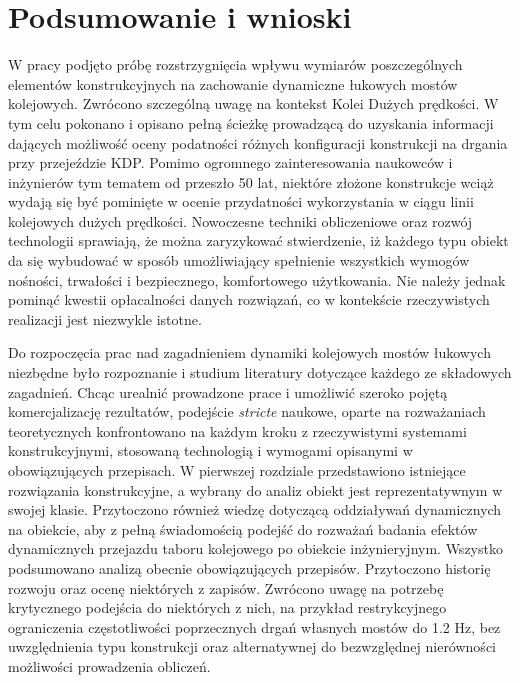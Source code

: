 \chapter*{Podsumowanie i wnioski}

W pracy podjęto próbę rozstrzygnięcia wpływu wymiarów poszczególnych elementów konstrukcyjnych na zachowanie dynamiczne łukowych mostów kolejowych. Zwrócono szczególną uwagę na kontekst Kolei Dużych prędkości. W tym celu pokonano i opisano pełną ścieżkę prowadzącą do uzyskania informacji dających możliwość oceny podatności różnych konfiguracji konstrukcji na drgania przy przejeździe KDP. Pomimo ogromnego zainteresowania naukowców i inżynierów tym tematem od przeszło 50 lat, niektóre złożone konstrukcje wciąż wydają się być pominięte w ocenie przydatności wykorzystania w ciągu linii kolejowych dużych prędkości. Nowoczesne techniki obliczeniowe oraz rozwój technologii sprawiają, że można zaryzykować stwierdzenie, iż każdego typu obiekt da się wybudować w sposób umożliwiający spełnienie wszystkich wymogów nośności, trwałości i bezpiecznego, komfortowego użytkowania. Nie należy jednak pominąć kwestii opłacalności danych rozwiązań, co w kontekście rzeczywistych realizacji jest niezwykle istotne.

Do rozpoczęcia prac nad zagadnieniem dynamiki kolejowych mostów łukowych niezbędne było rozpoznanie i studium literatury dotyczące każdego ze składowych zagadnień. Chcąc urealnić prowadzone prace i umożliwić szeroko pojętą komercjalizację rezultatów, podejście \textit{stricte} naukowe, oparte na rozważaniach teoretycznych konfrontowano na każdym kroku z rzeczywistymi systemami konstrukcyjnymi, stosowaną technologią i wymogami opisanymi w obowiązujących przepisach. W pierwszej rozdziale przedstawiono istniejące rozwiązania konstrukcyjne, a wybrany do analiz obiekt jest reprezentatywnym w swojej klasie. Przytoczono również wiedzę dotyczącą oddziaływań dynamicznych na obiekcie, aby z pełną świadomością podejść do rozważań badania efektów dynamicznych przejazdu taboru kolejowego po obiekcie inżynieryjnym. Wszystko podsumowano analizą obecnie obowiązujących przepisów. Przytoczono historię rozwoju oraz ocenę niektórych z zapisów. Zwrócono uwagę na potrzebę krytycznego podejścia do niektórych z nich, na przykład restrykcyjnego ograniczenia częstotliwości poprzecznych drgań własnych mostów do 1.2 Hz, bez uwzględnienia typu konstrukcji oraz alternatywnej do bezwzględnej nierówności możliwości prowadzenia obliczeń. 

